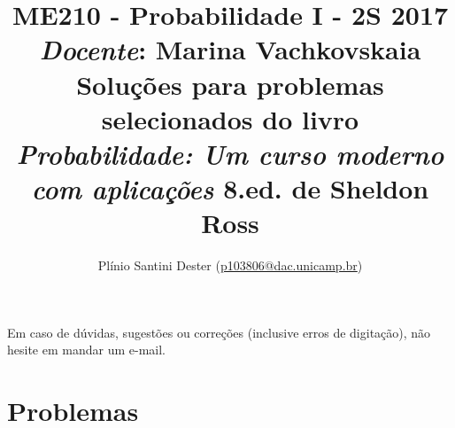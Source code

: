 


\title{	ME210 - Probabilidade I - 2S 2017\\
		{\large \textit{Docente}: Marina Vachkovskaia}\\[2mm]
		{\large Soluções para problemas selecionados do livro\\[-2mm]
        \textit{Probabilidade: Um curso moderno com aplicações}
        8.ed. de Sheldon Ross}\\
}
\author{Plínio Santini Dester (\url{p103806@dac.unicamp.br})}



\maketitle

Em caso de dúvidas, sugestões ou correções (inclusive erros de digitação), não hesite em mandar um e-mail.

\setcounter{section}{5}
\section{Problemas}

\newpage

% 


